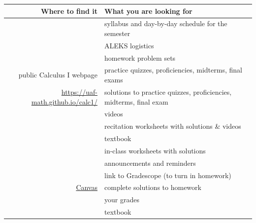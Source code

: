 \documentclass[12pt]{article}
\begin{document}
\begin{table}[h]
\centering
\begin{tabular}{rl}
Where to find it&What you are looking for\\
\hline \hline
&syllabus and day-by-day schedule for the semester\\
&ALEKS logistics\\
&homework problem sets\\
public Calculus I webpage&practice quizzes, proficiencies, midterms, final exams\\
\href{https://uaf-math.github.io/calc1/}{https://uaf-math.github.io/calc1/}&solutions to practice quizzes, proficiencies, midterms, final exam\\
&videos\\
&recitation worksheets with solutions \& videos\\
&textbook\\
&in-class worksheets with solutions\\
\hline
&announcements and reminders\\
&link to Gradescope (to turn in homework)\\
\href{https://canvas.alaska.edu/courses/31681}{Canvas}& complete solutions to homework\\
& your grades\\
&textbook\\
\end{tabular}
\end{table}
\end{document}
